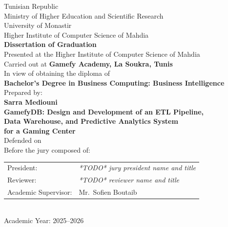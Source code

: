 \documentclass[12pt, a4paper]{report}
\begin{document}
\begin{titlepage}
\centering
\vspace*{1cm}

{\large Tunisian Republic}\\[0.3cm]
{\large Ministry of Higher Education and Scientific Research}\\[0.3cm]
{\large University of Monastir}\\[0.3cm]
{\large Higher Institute of Computer Science of Mahdia}\\[1.5cm]


\vspace{1cm}
{\Large \textbf{Dissertation of Graduation}}\\[0.4cm]
{\normalsize Presented at the Higher Institute of Computer Science of Mahdia}\\[0.2cm]
{\normalsize Carried out at \textbf{Gamefy Academy, La Soukra, Tunis}}\\[0.8cm]

{\normalsize In view of obtaining the diploma of}\\[0.2cm]
{\large \textbf{Bachelor's Degree in Business Computing: Business Intelligence}}\\[1.2cm]

{\normalsize Prepared by:}\\[0.2cm]
{\Large \textbf{Sarra Mediouni}}\\[1.2cm]

{\LARGE \textbf{GamefyDB: Design and Development of an ETL Pipeline,}}\\[0.3cm]
{\LARGE \textbf{Data Warehouse, and Predictive Analytics System}}\\[0.3cm]
{\LARGE \textbf{for a Gaming Center}}\\[1.5cm]

{\normalsize Defended on \underline{\hspace{3cm}}}\\[1cm]

{\normalsize Before the jury composed of:}\\[0.5cm]
\begin{tabular}{ll}
  President:            & \textit{*TODO* jury president name and title} \\
  Reviewer:             & \textit{*TODO* reviewer name and title} \\
  Academic Supervisor:  & Mr.\ Sofien Boutaib \\
\end{tabular}\\[1cm]

{\normalsize Academic Year: 2025--2026}

\end{titlepage}
\end{document}
